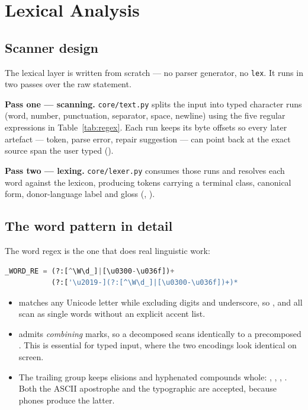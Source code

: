 \section{Lexical Analysis}\label{sec:lexical}

\subsection{Scanner design}

The lexical layer is written from scratch --- no parser generator, no \texttt{lex}. It runs
in two passes over the raw statement.

\textbf{Pass one --- scanning.} \texttt{core/text.py} splits the input into typed character
runs (word, number, punctuation, separator, space, newline) using the five regular
expressions in Table~\ref{tab:regex}. Each run keeps its byte offsets so every later
artefact --- token, parse error, repair suggestion --- can point back at the exact source
span the user typed ().

\textbf{Pass two --- lexing.} \texttt{core/lexer.py} consumes those runs and resolves each
word against the lexicon, producing tokens carrying a terminal class, canonical form,
donor-language label and gloss (, ).



\subsection{The word pattern in detail}

The word regex is the one that does real linguistic work:

\begin{lstlisting}[language=Python, numbers=none, basicstyle=\ttfamily\footnotesize]
_WORD_RE = (?:[^\W\d_]|[\u0300-\u036f])+
           (?:['\u2019-](?:[^\W\d_]|[\u0300-\u036f])+)*
\end{lstlisting}

\begin{itemize}[leftmargin=1.4em, itemsep=0.15em]
  \item {} matches any Unicode letter while
        excluding digits and underscore, so ,  and  all scan as
        single words without an explicit accent list.
  \item {} admits \emph{combining} marks,
        so a decomposed  scans identically to a precomposed . This is
        essential for typed input, where the two encodings look identical on screen.
  \item The trailing group keeps elisions and hyphenated compounds whole: ,
        , , . Both the ASCII apostrophe and the
        typographic  are accepted, because phones produce the latter.
\end{itemize}

